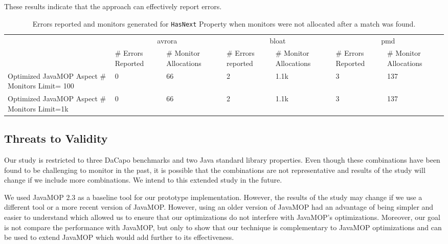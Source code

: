 These results indicate that the approach can effectively report errors.


\begin{table*}[ht]
\centering
\begin{tabular}{|p{3.7cm}|p{1.2cm}|p{1.5cm}|p{1.2cm}|p{1.5cm}|p{1.2cm}|p{1.5cm}|}
\hline
\multirow{2}{*}{}               & \multicolumn{2}{c|}{avrora}             & \multicolumn{2}{c|}{bloat}            & \multicolumn{2}{c|}{pmd}              \\ \cline{2-7} 
                                       & \# Errors Reported  & \# Monitor Allocations & \# Errors reported & \# Monitor Allocations& \# Errors Reported & \# Monitor Allocations\\ \hline
Optimized JavaMOP Aspect \# Monitors Limit= 100            & 0             & 66            & 2           & 1.1k              & 3               & 137     \\ \hline
Optimized JavaMOP Aspect \# Monitors Limit=1k           & 0             & 66           & 2            & 1.1k              & 3               & 137       \\ \hline
\end{tabular}
\caption{Errors reported and monitors generated for \texttt{HasNext} Property when monitors were not allocated after a match was found.}
\end{table*}
\label{table:errorreporting2}


\subsection{Threats to Validity}
\label{subsec:threats}

Our study is restricted to three DaCapo benchmarks and two Java standard library properties. Even though these combinations have been found to be challenging to monitor in the past, it is possible that the combinations are not representative and results of the study will change if we include more combinations. We intend to this extended study in the future.

We used JavaMOP 2.3 as a baseline tool for our prototype implementation. However, the results of the study may change if we use a different tool or a more recent version of JavaMOP. However, using an older version of JavaMOP had an advantage of being simpler and easier to understand which allowed us to ensure that our optimizations do not interfere with JavaMOP's optimizations. Moreover, our goal is not compare the performance with JavaMOP, but only to show that our technique is complementary to JavaMOP optimizations and can be used to extend JavaMOP which would add further to its effectiveness.

